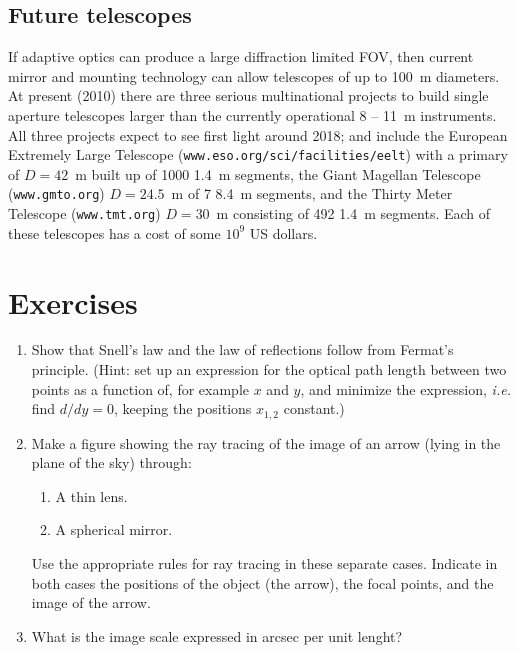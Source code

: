 \subsection{Future telescopes}

If adaptive optics can produce a large diffraction limited FOV, then current mirror and
mounting technology can allow telescopes of up to 100~m diameters. At present (2010)
there are three serious multinational projects to build single aperture telescopes larger 
than the currently operational 8 -- 11~m instruments. All three projects expect to see 
first light around 2018; and include the European Extremely Large Telescope 
({\tt www.eso.org/sci/facilities/eelt}) with a 
primary of $D=42$~m built up of 1000 1.4~m segments, the Giant Magellan Telescope
({\tt www.gmto.org})
$D=24.5$~m of 7 8.4~m segments, and the Thirty Meter Telescope 
({\tt www.tmt.org})
$D=30$~m consisting of 492 1.4~m segments. Each of these telescopes has a cost of
some $10^9$ US dollars.

\section{Exercises}

\begin{enumerate}
	\item Show that Snell's law and the law of reflections follow from
		Fermat's principle. (Hint: set up an expression for the optical path length
		between two points as a function of, for example $x$ and $y$, and
		minimize the expression, {\it i.e.} find ${d/dy}=0$, keeping the
		positions $x_{1,2}$ constant.)
	\item Make a figure showing the ray tracing of the image of an arrow (lying in the plane
		of the sky) through:
	\begin{enumerate}
		\item A thin lens.
		\item A spherical mirror.
	\end{enumerate}
	Use the appropriate rules for ray tracing in these separate cases.
	Indicate in both cases the positions of the
	object (the arrow), the focal points, and the image of the arrow.
	\item What is the image scale expressed in arcsec per unit lenght?
\end{enumerate}

%
